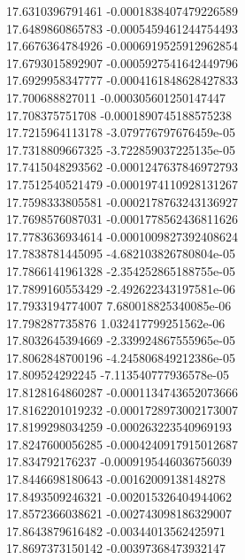 {17.6310396791461 -0.0001838407479226589 \\
17.6489860865783 -0.0005459461244754493 \\
17.6676364784926 -0.0006919525912962854 \\
17.6793015892907 -0.0005927541642449796 \\
17.6929958347777 -0.0004161848628427833 \\
17.700688827011 -0.000305601250147447 \\
17.708375751708 -0.0001890745188575238 \\
17.7215964113178 -3.079776797676459e-05 \\
17.7318809667325 -3.722859037225135e-05 \\
17.7415048293562 -0.0001247637846972793 \\
17.7512540521479 -0.0001974110928131267 \\
17.7598333805581 -0.0002178763243136927 \\
17.7698576087031 -0.0001778562436811626 \\
17.7783636934614 -0.0001009827392408624 \\
17.7838781445095 -4.682103826780804e-05 \\
17.7866141961328 -2.354252865188755e-05 \\
17.7899160553429 -2.492622343197581e-06 \\
17.7933194774007 7.680018825340085e-06 \\
17.798287735876 1.032417799251562e-06 \\
17.8032645394669 -2.339924867555965e-05 \\
17.8062848700196 -4.245806849212386e-05 \\
17.809524292245 -7.113540777936578e-05 \\
17.8128164860287 -0.0001134743652073666 \\
17.8162201019232 -0.0001728973002173007 \\
17.8199298034259 -0.000263223540969193 \\
17.8247600056285 -0.0004240917915012687 \\
17.834792176237 -0.0009195446036756039 \\
17.8446698180643 -0.00162009138148278 \\
17.8493509246321 -0.002015326404944062 \\
17.8572366038621 -0.002743098186329007 \\
17.8643879616482 -0.00344013562425971 \\
17.8697373150142 -0.00397368473932147 \\
}
